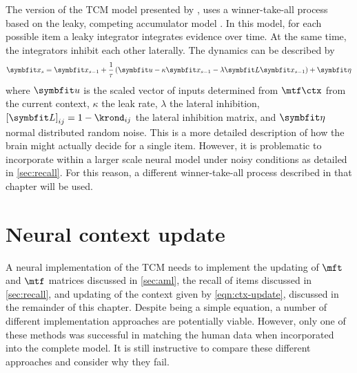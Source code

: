 The version of the TCM model presented by \textcite{Sederberg2008}, uses a winner-take-all process based on the leaky, competing accumulator model \parencite{Usher2001}.
In this model, for each possible item a leaky integrator integrates evidence over time.
At the same time, the integrators inhibit each other laterally.
The dynamics can be described by
\begin{equation}
    \vc x_s = \vc x_{s - 1} + \frac{1}{\tau} \del{\vc u - \kappa \vc x_{s - 1} - \lambda \mat L \vc x_{s - 1}} + \vc\eta
\end{equation}
where $\vc u$ is the scaled vector of inputs determined from $\mtf \ctx$ from the current context, $\kappa$ the leak rate, $\lambda$ the lateral inhibition, ${[\mat L]}_{ij} = 1 - \krond_{ij}$ the lateral inhibition matrix, and $\vc\eta$ normal distributed random noise.
This is a more detailed description of how the brain might actually decide for a single item.
However, it is problematic to incorporate within a larger scale neural model under noisy conditions as detailed in \cref{sec:recall}.
For this reason, a different winner-take-all process described in that chapter will be used.


\section{Neural context update}\label{sec:ctx-update}

A neural implementation of the TCM needs to implement the updating of $\mft$ and $\mtf$ matrices discussed in \cref{sec:aml}, the recall of items discussed in \cref{sec:recall}, and updating of the context given by \cref{eqn:ctx-update}, discussed in the remainder of this chapter.
Despite being a simple equation, a number of different implementation approaches are potentially viable.
However, only one of these methods was successful in matching the human data when incorporated into the complete model.
It is still instructive to compare these different approaches and consider why they fail.

